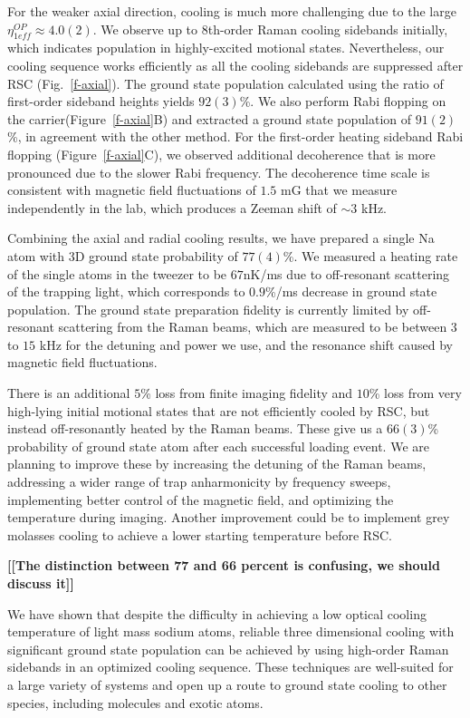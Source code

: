 \documentclass[aps,prl,twocolumn,groupedaddress]{revtex4-1}
\newcommand{\fxnote}[1]{{\textbf{[#1]}}}
\begin{document}
For the weaker axial direction, cooling is much more challenging
due to the large $\eta^{OP}_{1eff}\approx 4.0(2)$.
We observe up to 8th-order Raman cooling sidebands initially,
which indicates population in highly-excited motional states.
Nevertheless, our cooling sequence works efficiently as all the cooling sidebands are suppressed
after RSC (Fig.~\ref{f-axial}).
The ground state population calculated using the ratio of first-order sideband heights yields
$92(3)$\%. We also perform Rabi flopping on the carrier(Figure~\ref{f-axial}B)
and extracted a ground state population of $91(2)$\%, in agreement with the other method.
For the first-order heating sideband Rabi flopping (Figure~\ref{f-axial}C),
we observed additional decoherence that is more pronounced due to the slower Rabi frequency.
The decoherence time scale is consistent with magnetic field fluctuations of $1.5$ mG
that we measure independently in the lab, which produces a Zeeman shift of $\sim 3$ kHz.

Combining the axial and radial cooling results,
we have prepared a single Na atom with 3D ground state probability of $77(4)$\%.
We measured a heating rate of the single atoms in the tweezer to be $67$nK/ms
due to off-resonant scattering of the trapping light, which
corresponds to $0.9$\%/ms decrease in ground state population\cite{Grimm2000}.
The ground state preparation fidelity is currently limited by off-resonant scattering
from the Raman beams,
which are measured to be between $3$ to $15$ kHz for the detuning and power we use,
and the resonance shift caused by magnetic field fluctuations.

There is an additional $5$\% loss from finite imaging fidelity and $10$\% loss
from very high-lying initial motional states that are not efficiently cooled by RSC,
but instead off-resonantly heated by the Raman beams.
These give us a $66(3)$\% probability of ground state atom after each successful loading event.
We are planning to improve these by increasing the detuning of the Raman beams,
addressing a wider range of trap anharmonicity by frequency sweeps,
implementing better control of the magnetic field, and optimizing the temperature during imaging.
Another improvement could be to implement grey molasses cooling to achieve
a lower starting temperature before RSC\cite{Colzi2016}.

\fxnote{[The distinction between 77 and 66 percent is confusing, we should discuss it]}

We have shown that despite the difficulty in achieving a low optical cooling temperature
of light mass sodium atoms, reliable three dimensional cooling
with significant ground state population can be achieved by using high-order Raman sidebands
in an optimized cooling sequence.
These techniques are well-suited for a large variety of systems
and open up a route to ground state cooling to other species, including molecules and exotic atoms.
\end{document}
